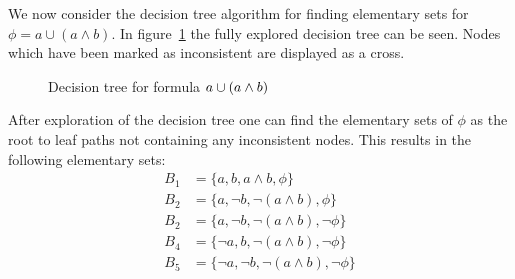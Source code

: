 \begin{example}
We now consider the decision tree algorithm for finding elementary sets for $\phi = a \cup (a \land b)$. In figure~\ref{fig:elemset} the fully explored decision tree can be seen. Nodes which have been marked as inconsistent are displayed as a cross.
\begin{figure}[!ht]
\begin{center}
    
    \caption{Decision tree for formula $a \cup (a \land b)$}
    \label{fig:elemset}
\end{center}
\end{figure}
After exploration of the decision tree one can find the elementary sets of $\phi$ as the root to leaf paths not containing any inconsistent nodes. This results in the following elementary sets:
\begin{align*}
    B_1 &= \{a,         b,         a\land b,           \phi\} \\
    B_2 &= \{a,         \lnot b,    \lnot (a\land b),   \phi\} \\
    B_2 &= \{a,         \lnot b,    \lnot (a\land b),   \lnot \phi\} \\
    B_4 &= \{\lnot a,   b,         \lnot (a\land b),  \lnot \phi\} \\
    B_5 &= \{\lnot a,   \lnot b,    \lnot (a\land b),   \lnot \phi\} \\
\end{align*}
\end{example}

